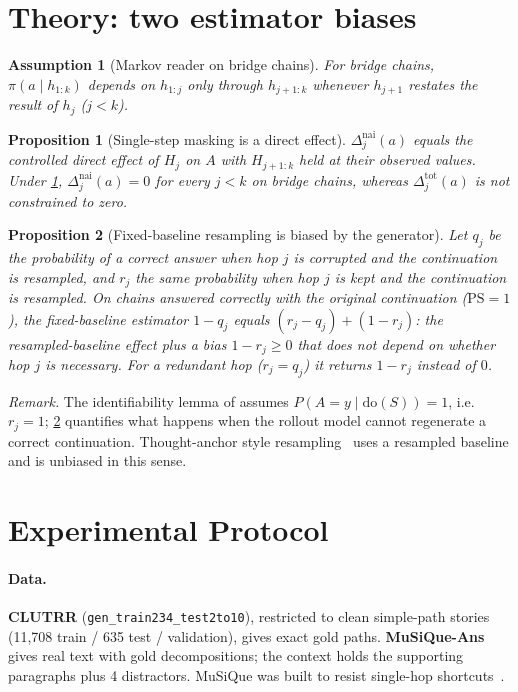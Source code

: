 \documentclass[11pt]{article}
\newtheorem{proposition}{Proposition}
\newtheorem{assumption}{Assumption}
\newcommand{\pa}{\pi}
\begin{document}
\section{Theory: two estimator biases}
\label{sec:theory}

\begin{assumption}[Markov reader on bridge chains]\label{as:markov}
For bridge chains, $\pa(a\mid h_{1:k})$ depends on $h_{1:j}$ only through $h_{j+1:k}$ whenever
$h_{j+1}$ restates the result of $h_j$ ($j<k$).
\end{assumption}

\begin{proposition}[Single-step masking is a direct effect]\label{prop:direct}
$\Delta^{\mathrm{nai}}_j(a)$ equals the controlled direct effect of $H_j$ on $A$ with $H_{j+1:k}$
held at their observed values. Under \cref{as:markov}, $\Delta^{\mathrm{nai}}_j(a)=0$ for every
$j<k$ on bridge chains, whereas $\Delta^{\mathrm{tot}}_j(a)$ is not constrained to zero.
\end{proposition}

\begin{proposition}[Fixed-baseline resampling is biased by the generator]\label{prop:rollout}
Let $q_j$ be the probability of a correct answer when hop $j$ is corrupted and the continuation is
resampled, and $r_j$ the same probability when hop $j$ is kept and the continuation is resampled.
On chains answered correctly with the original continuation ($\mathrm{PS}=1$), the
fixed-baseline estimator $1-q_j$ equals $(r_j-q_j)+(1-r_j)$: the resampled-baseline effect plus a
bias $1-r_j\ge0$ that does not depend on whether hop $j$ is necessary. For a redundant hop
($r_j=q_j$) it returns $1-r_j$ instead of $0$.
\end{proposition}
\emph{Remark.} The identifiability lemma of \citet{yu2025pns} assumes $P(A{=}y\mid\mathrm{do}(S))=1$,
i.e.\ $r_j=1$; \cref{prop:rollout} quantifies what happens when the rollout model cannot
regenerate a correct continuation. Thought-anchor style resampling~\citep{bogdan2025anchors}
uses a resampled baseline and is unbiased in this sense.

\section{Experimental Protocol}
\label{sec:protocol}
\paragraph{Data.} \textbf{CLUTRR} (\texttt{gen\_train234\_test2to10}), restricted to clean
simple-path stories (11{,}708 train / 635 test / validation), gives exact gold paths.
\textbf{MuSiQue-Ans} gives real text with gold decompositions; the context holds the supporting
paragraphs plus 4 distractors. MuSiQue was built to resist single-hop
shortcuts~\citep{min2019compositional}.
\end{document}
